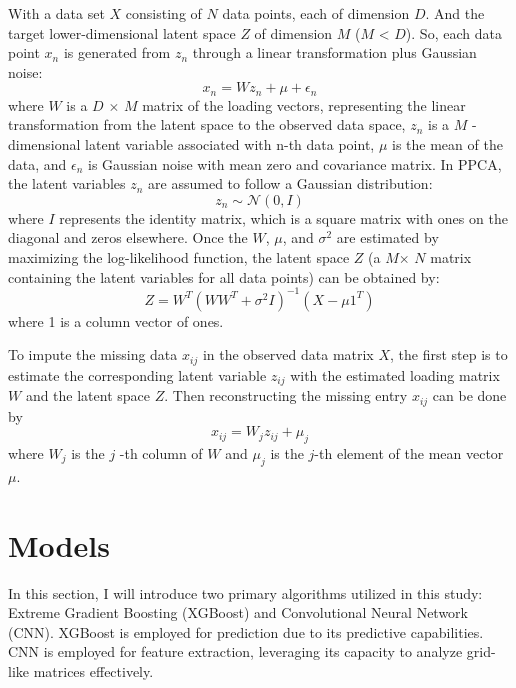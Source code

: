 \documentclass[12pt,a4paper,english
]{tunithesis}
\begin{document}
With a data set $X$ consisting of $N$ data points, each of dimension $D$. And the target lower-dimensional latent space $Z$ of dimension $M$ ($M$ < $D$). So, each data point $x_n$ is generated from $z_n$ through a linear transformation plus Gaussian noise:
\begin{equation}
    {x_n} = {W}{z_n}+{\mu}+{\epsilon _n}
\end{equation}
where $W$ is a $D$ $\times$ $M$ matrix of the loading vectors, representing the linear transformation from the latent space to the observed data space, $z_n$ is a $M$ -dimensional latent variable associated with n-th data point, $\mu$ is the mean of the data, and $\epsilon _n$ is Gaussian noise with mean zero and covariance matrix.
In PPCA, the latent variables $z_n$ are assumed to follow a Gaussian distribution:
\begin{equation}
    {z_n} \sim {\mathcal{N}}(0, {I})
\end{equation}
where $I$ represents the identity matrix, which is a square matrix with ones on the diagonal and zeros elsewhere. Once the $W$, $\mu$, and $\sigma ^2$ are estimated by maximizing the log-likelihood function, the latent space $Z$ (a $M$$\times$ $N$ matrix containing the latent variables for all data points) can be obtained by:
\begin{equation}
    {Z} = {W^T}{({W}{W^T}+{\sigma ^2}{I})^{-1}}({X}-{\mu}{1^T})
\end{equation}
where 1 is a column vector of ones.

To impute the missing data $x_{ij}$ in the observed data matrix $X$, the first step is to estimate the corresponding latent variable $z_{ij}$ with the estimated loading matrix $W$ and the latent space $Z$. Then reconstructing the missing entry  $x_{ij}$ can be done by
\begin{equation}
    {x_{ij}} = {W_j}{z_{ij}}+{\mu _j}
\end{equation}
where $W_j$ is the $j$ -th column of $W$ and $\mu_j$ is the $j$-th element of the mean vector $\mu$.


\section{Models}
In this section, I will introduce two primary algorithms utilized in this study: Extreme Gradient Boosting (XGBoost) and Convolutional Neural Network (CNN). XGBoost is employed for prediction due to its predictive capabilities. CNN is employed for feature extraction, leveraging its capacity to analyze grid-like matrices effectively.
\end{document}
